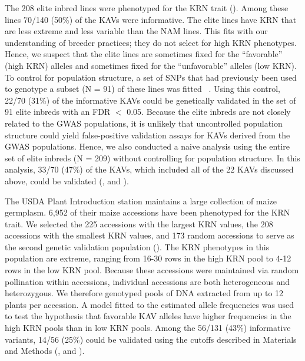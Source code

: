 \documentclass[10pt,letterpaper]{article}
\begin{document}
The 208 elite inbred lines were phenotyped for the KRN trait (). Among these lines 70/140 (50\%) of the KAVs were informative. The elite lines have KRN that are less extreme and less variable than the NAM lines. This fits with our understanding of breeder practices; they do not select for high KRN phenotypes. Hence, we suspect that the elite lines are sometimes fixed for the “favorable” (high KRN) alleles and sometimes fixed for the “unfavorable” alleles (low KRN). To control for population structure, a set of SNPs that had previously been used to genotype a subset (N = 91) of these lines was fitted ~\cite{Nelson2008}. Using this control, 22/70 (31\%) of the informative KAVs could be genetically validated in the set of 91 elite inbreds with an FDR $<$ 0.05. Because the elite inbreds are not closely related to the GWAS populations, it is unlikely that uncontrolled population structure could yield false-positive validation assays for KAVs derived from the GWAS populations. Hence, we also conducted a naive analysis using the entire set of elite inbreds (N = 209) without controlling for population structure. In this analysis, 33/70 (47\%) of the KAVs, which included all of the 22 KAVs discussed above, could be validated (,  and ). 

The USDA Plant Introduction station maintains a large collection of maize germplasm. 6,952 of their maize accessions have been phenotyped for the KRN trait. We selected the 225 accessions with the largest KRN values, the 208 accessions with the smallest KRN values, and 173 random accessions to serve as the second genetic validation population (). The KRN phenotypes in this population are extreme, ranging from 16-30 rows in the high KRN pool to 4-12 rows in the low KRN pool. Because these accessions were maintained via random pollination within accessions, individual accessions are both heterogeneous and heterozygous. We therefore genotyped pools of DNA extracted from up to 12 plants per accession. A model fitted to the estimated allele frequencies was used to test the hypothesis that favorable KAV alleles have higher frequencies in the high KRN pools than in low KRN pools. Among the 56/131 (43\%) informative variants, 14/56 (25\%) could be validated using the cutoffs described in Materials and Methods (,  and ). 
\end{document}
